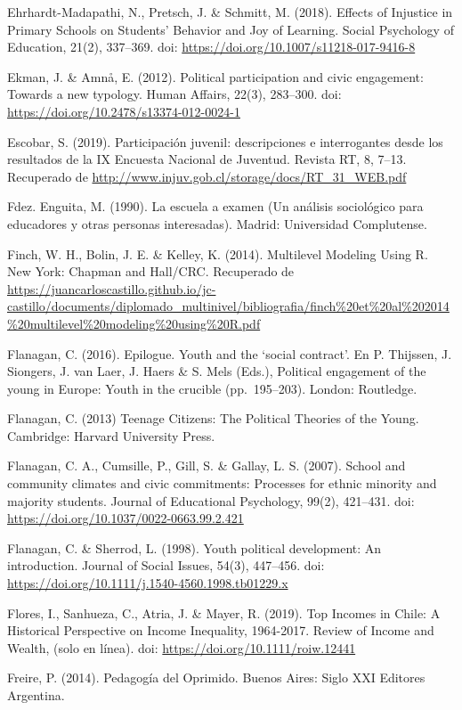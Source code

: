 \documentclass[12pt,twoside]{templates/facsothesis}
\begin{document}
Ehrhardt-Madapathi, N., Pretsch, J. \& Schmitt, M. (2018). Effects of Injustice in Primary Schools on Students' Behavior and Joy of Learning. Social Psychology of Education, 21(2), 337--369. doi: \url{https://doi.org/10.1007/s11218-017-9416-8}

Ekman, J. \& Amnå, E. (2012). Political participation and civic engagement: Towards a new typology. Human Affairs, 22(3), 283--300. doi: \url{https://doi.org/10.2478/s13374-012-0024-1}

Escobar, S. (2019). Participación juvenil: descripciones e interrogantes desde los resultados de la IX Encuesta Nacional de Juventud. Revista RT, 8, 7--13. Recuperado de \url{http://www.injuv.gob.cl/storage/docs/RT_31_WEB.pdf}

Fdez. Enguita, M. (1990). La escuela a examen (Un análisis sociológico para educadores y otras personas interesadas). Madrid: Universidad Complutense.

Finch, W. H., Bolin, J. E. \& Kelley, K. (2014). Multilevel Modeling Using R. New York: Chapman and Hall/CRC. Recuperado de \url{https://juancarloscastillo.github.io/jc-castillo/documents/diplomado_multinivel/bibliografia/finch\%20et\%20al\%202014\%20multilevel\%20modeling\%20using\%20R.pdf}

Flanagan, C. (2016). Epilogue. Youth and the `social contract'. En P. Thijssen, J. Siongers, J. van Laer, J. Haers \& S. Mels (Eds.), Political engagement of the young in Europe: Youth in the crucible (pp.~195--203). London: Routledge.

Flanagan, C. (2013) Teenage Citizens: The Political Theories of the Young. Cambridge: Harvard University Press.

Flanagan, C. A., Cumsille, P., Gill, S. \& Gallay, L. S. (2007). School and community climates and civic commitments: Processes for ethnic minority and majority students. Journal of Educational Psychology, 99(2), 421--431. doi: \url{https://doi.org/10.1037/0022-0663.99.2.421}

Flanagan, C. \& Sherrod, L. (1998). Youth political development: An introduction. Journal of Social Issues, 54(3), 447--456. doi: \url{https://doi.org/10.1111/j.1540-4560.1998.tb01229.x}

Flores, I., Sanhueza, C., Atria, J. \& Mayer, R. (2019). Top Incomes in Chile: A Historical Perspective on Income Inequality, 1964-2017. Review of Income and Wealth, (solo en línea). doi: \url{https://doi.org/10.1111/roiw.12441}

Freire, P. (2014). Pedagogía del Oprimido. Buenos Aires: Siglo XXI Editores Argentina.
\end{document}
